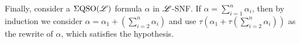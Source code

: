 Finally, consider a $\Sigma{\rm QSO}(\mathscr{L})$ formula $\alpha$ in $\mathscr{L}$-SNF. 
If $\alpha = \sum_{i = 1}^n\alpha_i$, then by induction we consider $\alpha = \alpha_1 + (\sum_{i = 2}^n\alpha_i)$ and use $\tau(\alpha_1 + \tau(\sum_{i = 2}^n\alpha_i))$ as the rewrite of $\alpha$, which satisfies the hypothesis.

